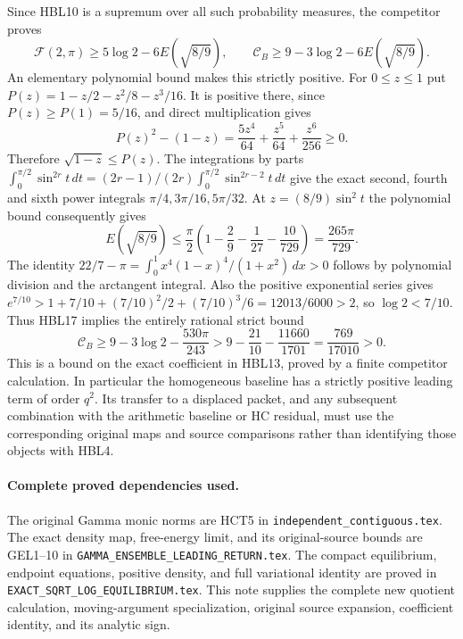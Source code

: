 \documentclass[11pt,a4paper]{article}
\begin{document}
Since HBL10 is a supremum over all such probability measures,
the competitor proves
\[
 \mathcal F(2,\pi)\ge5\log2-6E(\sqrt{8/9}),\qquad
 \mathcal C_B\ge9-3\log2-6E(\sqrt{8/9}).
 \tag{HBL17}
\]
An elementary polynomial bound makes this strictly positive. For
$0\le z\le1$ put $P(z)=1-z/2-z^2/8-z^3/16$. It is positive there,
since $P(z)\ge P(1)=5/16$, and direct multiplication gives
\[
 P(z)^2-(1-z)=\frac{5z^4}{64}+\frac{z^5}{64}+\frac{z^6}{256}\ge0.
\]
Therefore $\sqrt{1-z}\le P(z)$. The integrations by parts
$\int_0^{\pi/2}\sin^{2r}t\,dt=
 (2r-1)/(2r)\int_0^{\pi/2}\sin^{2r-2}t\,dt$ give the exact
second, fourth and sixth power integrals $\pi/4,3\pi/16,5\pi/32$.
At $z=(8/9)\sin^2t$ the polynomial bound consequently gives
\[
 E(\sqrt{8/9})\le\frac\pi2
 \left(1-\frac29-\frac1{27}-\frac{10}{729}\right)
 =\frac{265\pi}{729}.
\]
The identity
$22/7-\pi=\int_0^1x^4(1-x)^4/(1+x^2)\,dx>0$
follows by polynomial division and the arctangent integral.
Also the positive exponential series gives
$e^{7/10}>1+7/10+(7/10)^2/2+(7/10)^3/6=12013/6000>2$,
so $\log2<7/10$. Thus HBL17 implies the entirely rational strict bound
\[
 \boxed{\mathcal C_B\ge9-3\log2-\frac{530\pi}{243}
       >9-\frac{21}{10}-\frac{11660}{1701}
       =\frac{769}{17010}>0.}
 \tag{HBL18}
\]
This is a bound on the exact coefficient in HBL13, proved by a finite
competitor calculation. In particular the homogeneous baseline has a
strictly positive leading term of order $q^2$. Its transfer to a
displaced packet, and any subsequent combination with the arithmetic
baseline or HC residual, must use the corresponding original maps and
source comparisons rather than identifying those objects with HBL4.

\paragraph{Complete proved dependencies used.}
The original Gamma monic norms are HCT5 in
\texttt{independent\_contiguous.tex}. The exact density map, free-energy
limit, and its original-source bounds are GEL1--10 in
\texttt{GAMMA\_ENSEMBLE\_LEADING\_RETURN.tex}. The compact equilibrium,
endpoint equations, positive density, and full variational identity are
proved in \texttt{EXACT\_SQRT\_LOG\_EQUILIBRIUM.tex}. This note supplies
the complete new quotient calculation, moving-argument specialization,
original source expansion, coefficient identity, and its analytic sign.




\end{document}
